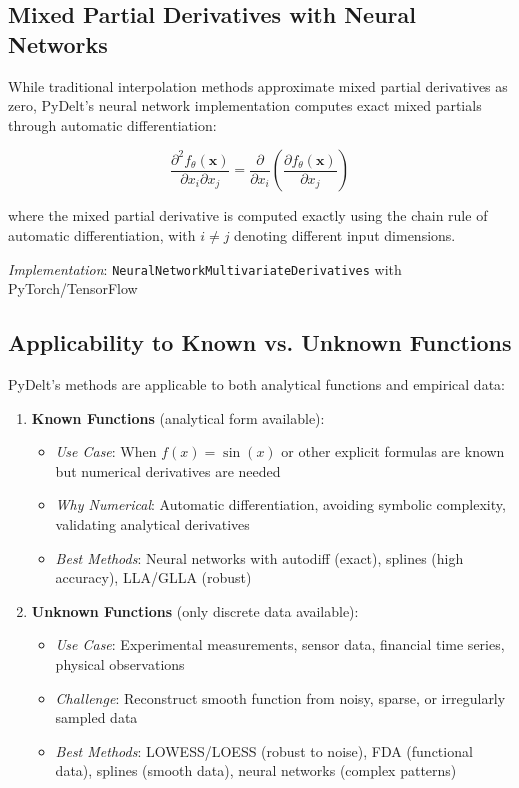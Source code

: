 \documentclass[10pt,journal,compsoc]{IEEEtran}
\begin{document}
\subsection{Mixed Partial Derivatives with Neural Networks}

While traditional interpolation methods approximate mixed partial derivatives as zero, PyDelt's neural network implementation computes exact mixed partials through automatic differentiation:

\begin{equation}
    \frac{\partial^2 f_{\theta}(\mathbf{x})}{\partial x_i \partial x_j} = \frac{\partial}{\partial x_i}\left(\frac{\partial f_{\theta}(\mathbf{x})}{\partial x_j}\right)
\end{equation}

where the mixed partial derivative is computed exactly using the chain rule of automatic differentiation, with $i \neq j$ denoting different input dimensions.

\textit{Implementation}: \texttt{NeuralNetworkMultivariateDerivatives} with PyTorch/TensorFlow

\subsection{Applicability to Known vs. Unknown Functions}

PyDelt's methods are applicable to both analytical functions and empirical data:

\begin{enumerate}
    \item \textbf{Known Functions} (analytical form available):
    \begin{itemize}
        \item \textit{Use Case}: When $f(x) = \sin(x)$ or other explicit formulas are known but numerical derivatives are needed
        \item \textit{Why Numerical}: Automatic differentiation, avoiding symbolic complexity, validating analytical derivatives
        \item \textit{Best Methods}: Neural networks with autodiff (exact), splines (high accuracy), LLA/GLLA (robust)
    \end{itemize}
    
    \item \textbf{Unknown Functions} (only discrete data available):
    \begin{itemize}
        \item \textit{Use Case}: Experimental measurements, sensor data, financial time series, physical observations
        \item \textit{Challenge}: Reconstruct smooth function from noisy, sparse, or irregularly sampled data
        \item \textit{Best Methods}: LOWESS/LOESS (robust to noise), FDA (functional data), splines (smooth data), neural networks (complex patterns)
    \end{itemize}
\end{enumerate}
\end{document}

